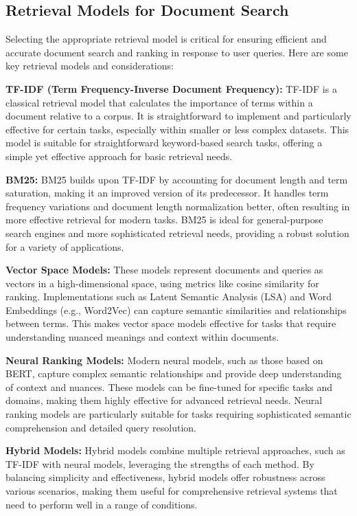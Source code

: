 \subsection{Retrieval Models for Document Search}

Selecting the appropriate retrieval model is critical for ensuring efficient and accurate document search and ranking in response to user queries. Here are some key retrieval models and considerations:

\textbf{TF-IDF (Term Frequency-Inverse Document Frequency):}
TF-IDF is a classical retrieval model that calculates the importance of terms within a document relative to a corpus. It is straightforward to implement and particularly effective for certain tasks, especially within smaller or less complex datasets. This model is suitable for straightforward keyword-based search tasks, offering a simple yet effective approach for basic retrieval needs.

\textbf{BM25:}
BM25 builds upon TF-IDF by accounting for document length and term saturation, making it an improved version of its predecessor. It handles term frequency variations and document length normalization better, often resulting in more effective retrieval for modern tasks. BM25 is ideal for general-purpose search engines and more sophisticated retrieval needs, providing a robust solution for a variety of applications.

\textbf{Vector Space Models:}
These models represent documents and queries as vectors in a high-dimensional space, using metrics like cosine similarity for ranking. Implementations such as Latent Semantic Analysis (LSA) and Word Embeddings (e.g., Word2Vec) can capture semantic similarities and relationships between terms. This makes vector space models effective for tasks that require understanding nuanced meanings and context within documents.

\textbf{Neural Ranking Models:}
Modern neural models, such as those based on BERT, capture complex semantic relationships and provide deep understanding of context and nuances. These models can be fine-tuned for specific tasks and domains, making them highly effective for advanced retrieval needs. Neural ranking models are particularly suitable for tasks requiring sophisticated semantic comprehension and detailed query resolution.

\textbf{Hybrid Models:}
Hybrid models combine multiple retrieval approaches, such as TF-IDF with neural models, leveraging the strengths of each method. By balancing simplicity and effectiveness, hybrid models offer robustness across various scenarios, making them useful for comprehensive retrieval systems that need to perform well in a range of conditions.